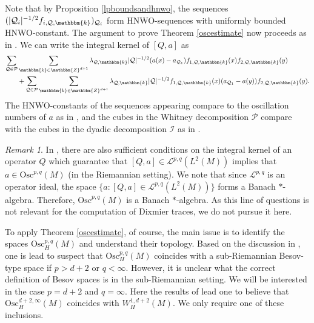 \documentclass[10pt]{amsart}
\theoremstyle{remark}
\newtheorem{remark}[thm]{Remark}
\theoremstyle{definition}
\begin{document}
Note that by Proposition \ref{lpboundsandhnwo}, the sequences $(|\mathcal{Q}_i|^{-1/2}f_{i,\mathcal{Q},\mathbbm{k}})_{\mathcal{Q}_i}$ form HNWO-sequences with uniformly bounded HNWO-constant. The argument to prove Theorem \ref{oscestimate} now proceeds as in \cite[Page 252-253]{rochbergsemmes}. We can write the integral kernel of $[Q,a]$ as 
\begin{align*}
\sum_{\mathcal{Q}\in \mathcal{P}}&\sum_{\mathbbm{k}\in {\mathbbm{Z}}^{d+1}} \lambda_{\mathcal{Q},\mathbbm{k}} |\mathcal{Q}|^{-1/2} (a(x)-a_{\mathcal{Q}_1})f_{1,\mathcal{Q},\mathbbm{k}}(x)f_{2,\mathcal{Q},\mathbbm{k}}(y)\\
&+\sum_{\mathcal{Q}\in \mathcal{P}}\sum_{\mathbbm{k}\in {\mathbbm{Z}}^{d+1}} \lambda_{\mathcal{Q},\mathbbm{k}} |\mathcal{Q}|^{-1/2} f_{1,\mathcal{Q},\mathbbm{k}}(x)(a_{\mathcal{Q}_1}-a(y)) f_{2,\mathcal{Q},\mathbbm{k}}(y).
\end{align*}
The HNWO-constants of the sequences appearing compare to the oscillation numbers of $a$ as in \cite[Page 252]{rochbergsemmes}, and the cubes in the Whitney decomposition $\mathcal{P}$ compare with the cubes in the dyadic decomposition $\mathcal{I}$ as in \cite[Page 253]{rochbergsemmes}.

\begin{remark}
In \cite{rochbergsemmes}, there are also sufficient conditions on the integral kernel of an operator $Q$ which guarantee that $[Q,a]\in \mathcal{L}^{p,q}(L^2(M))$ implies that  $a\in \mathrm{Osc}^{p,q}(M)$ (in the Riemannian setting). We note that since $\mathcal{L}^{p,q}$ is an operator ideal, the space $\{a:[Q,a]\in \mathcal{L}^{p,q}(L^2(M))\}$ forms a Banach $*$-algebra. Therefore, $\mathrm{Osc}^{p,q}(M)$ is a Banach $*$-algebra. As this line of questions is not relevant for the computation of Dixmier traces, we do not pursue it here.
\end{remark}

To apply Theorem \ref{oscestimate}, of course, the main issue is to identify the spaces $\mathrm{Osc}^{p,q}_H(M)$ and understand their topology. Based on the discussion in \cite[Chapter 4]{rochbergsemmes}, one is lead to suspect that $ \mathrm{Osc}^{p,q}_H(M)$ coincides with a sub-Riemannian Besov-type space if $p>d+2$ or $q<\infty$. However, it is unclear what the correct definition of Besov spaces is in the sub-Riemannian setting. We will be interested in the case $p=d+2$ and $q=\infty$. Here the results of \cite[Appendix]{connessulltele} lead one to believe that $\mathrm{Osc}^{d+2,\infty}_H(M)$ coincides with $W^{1,d+2}_H(M)$. We only require one of these inclusions. 
\end{document}
